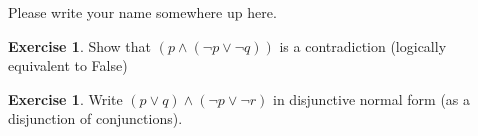 \documentclass[letterpaper,12pt]{article}
\theoremstyle{plain}
\theoremstyle{definition}
\newtheorem{exer}[thm]{Exercise}
\theoremstyle{remark}
\providecommand{\land}{\ensuremath{\wedge}}
\providecommand{\lor}{\ensuremath{\vee}}
\begin{document}
\pagestyle{fancy}

Please write your name somewhere up here.
\begin{exer}
Show that $(p \land (\lnot p \lor \lnot q))$ is a contradiction (logically equivalent to False)
\vspace{10cm}
\end{exer}

\begin{exer}
Write $(p \lor q ) \land (\lnot p \lor \lnot r)$ in disjunctive normal form (as a disjunction of conjunctions).

\end{exer}
\vspace{5cm}
\end{document}

